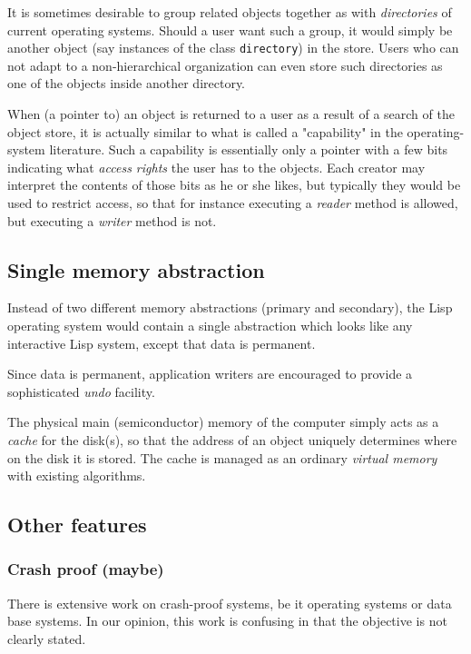 It is sometimes desirable to group related objects together as
with \emph{directories} of current operating systems.  Should a user
want such a group, it would simply be another object (say instances
of the class \texttt{directory}) in the store.  Users who can not
adapt to a non-hierarchical organization can even store such
directories as one of the objects inside another directory.

When (a pointer to) an object is returned to a user as a result of a
search of the object store, it is actually similar to what is called
a "capability" in the operating-system literature.  Such a
capability is essentially only a pointer with a few bits indicating
what \emph{access rights} the user has to the objects.  Each creator
may interpret the contents of those bits as he or she likes, but
typically they would be used to restrict access, so that for
instance executing a \emph{reader} method is allowed, but executing
a \emph{writer} method is not.

\subsection{Single memory abstraction}

Instead of two different memory abstractions (primary and
secondary), the Lisp operating system would contain a single
abstraction which looks like any interactive Lisp system, except
that data is permanent.

Since data is permanent, application writers are encouraged to
provide a sophisticated \emph{undo} facility.  

The physical main (semiconductor) memory of the computer simply acts
as a \emph{cache} for the disk(s), so that the address of an object
uniquely determines where on the disk it is stored.  The cache is
managed as an ordinary \emph{virtual memory} with existing
algorithms. 

\subsection{Other features}

\subsubsection{Crash proof (maybe)}

There is extensive work on crash-proof systems, be it operating
systems or data base systems.  In our opinion, this work is
confusing in that the objective is not clearly stated.

